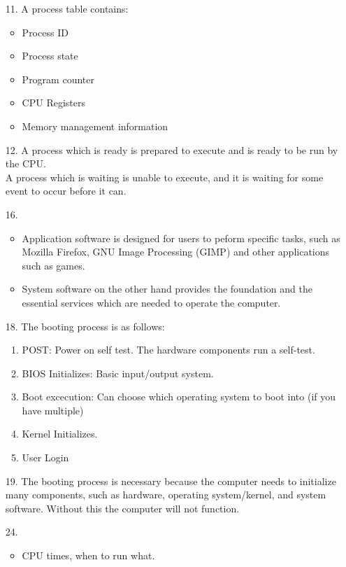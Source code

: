 \documentclass[hidelinks,12pt]{article}
\begin{document}
\begin{enumerate}
    \item[11.] A process table contains:\begin{itemize}
            \item Process ID
            \item Process state
            \item Program counter
            \item CPU Registers
            \item Memory management information
    \end{itemize}
    \item[12.] A process which is ready is prepared to execute and is ready to be run by the CPU.\\
        A process which is waiting is unable to execute, and it is waiting for some event to occur before it can.
    \item[16.]\begin{itemize}
            \item Application software is designed for users to peform specific tasks, such as Mozilla Firefox, GNU Image Processing (GIMP) and other applications such as games.
            \item System software on the other hand provides the foundation and the essential services which are needed to operate the computer.
        \end{itemize}
    \item[18.] The booting process is as follows:\begin{enumerate}
            \item POST: Power on self test. The hardware components run a self-test. 
            \item BIOS Initializes: Basic input/output system.
            \item Boot excecution: Can choose which operating system to boot into (if you have multiple)
            \item Kernel Initializes.
            \item User Login
    \end{enumerate}
    \item[19.] The booting process is necessary because the computer needs to initialize many components, such as hardware, operating system/kernel, and system software. Without this the computer will not function.
    \item[24.] \begin{itemize}
            \item CPU times, when to run what.

\end{itemize}
\end{enumerate}
\end{document}
